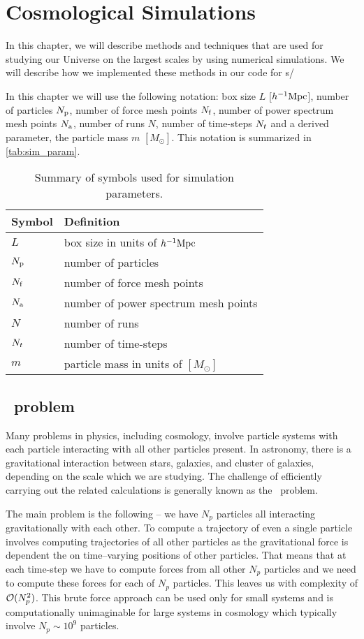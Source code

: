 \chapter{Cosmological Simulations}
\label{chpt:cosmo_sim}
In this chapter, we will describe methods and techniques that are used for studying our Universe on the largest scales by using numerical simulations. We will describe how we implemented these methods in our code for \nbodysim s/

In this chapter we will use the following notation: box size $L$ [$h^{-1}\text{Mpc}$], number of particles $N_{\rm p}$, number of force mesh points $N_{\rm f}$, number of power spectrum mesh points $N_{\rm a}$, number of runs $N$, number of time-steps $N_t$ and a derived parameter, the particle mass $m$ $[M_\odot]$. This notation is summarized in \autoref{tab:sim_param}.

\begin{table}
\begin{tabular}{ll}
    \hline \hline
    Symbol & Definition \\
    \hline
    $L$ & box size in units of $h^{-1}\text{Mpc}$ \\
    $N_{\rm p}$ & number of particles \\
    $N_{\rm f}$ & number of force mesh points \\
    $N_{\rm a}$ & number of power spectrum mesh points \\
    $N$ & number of runs \\
    $N_t$ & number of time-steps \\
    $m$ & particle mass in units of $[M_\odot]$ \\
    \hline \hline
\end{tabular}
\caption{Summary of symbols used for simulation parameters.}
\label{tab:sim_param}
\end{table}


\section{\nbody\ problem}
Many problems in physics, including cosmology, involve particle systems with each particle interacting with all other particles present. In astronomy, there is a gravitational interaction between stars, galaxies, and cluster of galaxies, depending on the scale which we are studying. The challenge of efficiently carrying out the related calculations is generally known as the \nbody\ problem.

The main problem is the following -- we have $N_p$ particles all interacting gravitationally with each other. To compute a trajectory of even a single particle involves computing trajectories of all other particles as the gravitational force is dependent the on time--varying positions of other particles. That means that at each time-step we have to compute forces from all other $N_p$ particles and we need to compute these forces for each of $N_p$ particles. This leaves us with complexity of \(\mathcal{O}(N_p^2)\). This brute force approach can be used only for small systems and is computationally unimaginable for large systems in cosmology which typically involve \(N_p\sim10^{9}\) particles.

